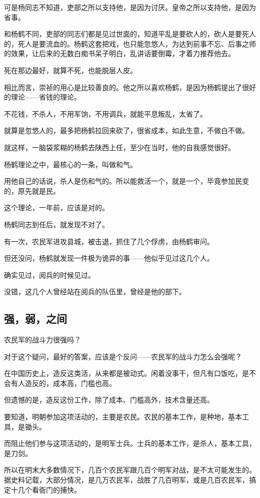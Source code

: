 \begin{multicols}{\theparacolNo}
		可是杨同志不知道，吏部之所以支持他，是因为讨厌。皇帝之所以支持他，是因为省事。

		和杨鹤不同，吏部的同志们都是见过世面的，知道平乱是要砍人的，砍人是要死人的，死人是要流血的。杨鹤这套把戏，也只能忽悠人，为达到前事不忘、后事之师的效果，让后来的无数白痴书呆子明白，乱讲话要倒霉，才着力推荐他去。

		死在那边最好，就算不死，也能脱层人皮。

		相比而言，崇祯的用心是比较善良的。他之所以喜欢杨鹤，是因为杨鹤提出了很好的理论——省钱的理论。

		不花钱，不杀人，不用军饷，不用调兵，就能平息叛乱，太省了。

		就算是忽悠人的，最多把杨鹤拉回来砍了，很省成本，如此生意，不做白不做。

		就这样，一脑袋浆糊的杨鹤去陕西上任，至少在当时，他的自我感觉很好。

		杨鹤理论之中，最核心的一条，叫做和气。

		用他自己的话说，杀人是伤和气的。所以能救活一个，就是一个，毕竟参加民变的，原先就是民。

		这个理论，一年前，应该是对的。

		杨鹤同志到任后，就发现不对了。

		有一次，农民军进攻县城，被击退，抓住了几个俘虏，由杨鹤审问。

		但还没问，杨鹤就发现一件极为诡异的事——他似乎见过这几个人。

		确实见过，阅兵的时候见过。

		没错，这几个人曾经站在阅兵的队伍里，曾经是他的部下。

		\subsection{强，弱，之间}
		农民军的战斗力很强吗？

		对于这个疑问，最好的答案，应该是个反问——农民军的战斗力怎么会强呢？

		在中国历史上，造反这类活，从来都是被动式。闲着没事干，但凡有口饭吃，是不会有人造反的，成本高，门槛也高。

		但遗憾的是，造反这份工作，除了成本、门槛高外，技术含量还高。

		要知道，明朝参加这项活动的，主要是农民。农民的基本工作，是种地，基本工具，是锄头。

		而阻止他们参与这项活动的，是明军士兵。士兵的基本工作，是杀人，基本工具，是刀剑。

		所以在明末大多数情况下，几百个农民军跟几百个明军对战，是不太可能发生的。据史料记载，大部分情况，是几万农民军，战胜了几百明军，或是几百农民军，搞定十几个看衙门的捕快。


\end{multicols}
